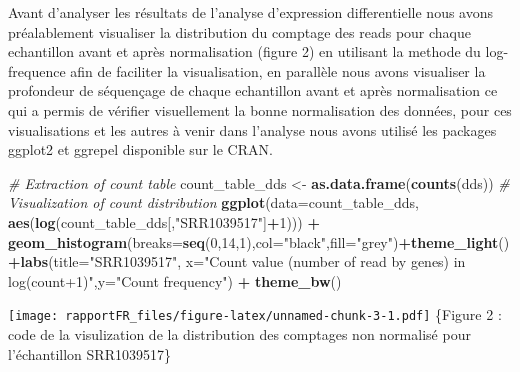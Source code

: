 \documentclass[
  12pt,
]{article}
\newenvironment{Shaded}{\begin{snugshade}}{\end{snugshade}}
\newcommand{\CommentTok}[1]{\textcolor[rgb]{0.56,0.35,0.01}{\textit{#1}}}
\newcommand{\DataTypeTok}[1]{\textcolor[rgb]{0.13,0.29,0.53}{#1}}
\newcommand{\DecValTok}[1]{\textcolor[rgb]{0.00,0.00,0.81}{#1}}
\newcommand{\KeywordTok}[1]{\textcolor[rgb]{0.13,0.29,0.53}{\textbf{#1}}}
\newcommand{\NormalTok}[1]{#1}
\newcommand{\OperatorTok}[1]{\textcolor[rgb]{0.81,0.36,0.00}{\textbf{#1}}}
\newcommand{\StringTok}[1]{\textcolor[rgb]{0.31,0.60,0.02}{#1}}
\begin{document}
Avant d'analyser les résultats de l'analyse d'expression differentielle
nous avons préalablement visualiser la distribution du comptage des
reads pour chaque echantillon avant et après normalisation (figure 2) en
utilisant la methode du log-frequence afin de faciliter la
visualisation, en parallèle nous avons visualiser la profondeur de
séquençage de chaque echantillon avant et après normalisation ce qui a
permis de vérifier visuellement la bonne normalisation des données, pour
ces visualisations et les autres à venir dans l'analyse nous avons
utilisé les packages ggplot2 et ggrepel disponible sur le CRAN.

\begin{Shaded}
\begin{Highlighting}[]
\CommentTok{# Extraction of count table}
\NormalTok{count_table_dds <-}\StringTok{ }\KeywordTok{as.data.frame}\NormalTok{(}\KeywordTok{counts}\NormalTok{(dds))}
\CommentTok{# Visualization of count distribution}
\KeywordTok{ggplot}\NormalTok{(}\DataTypeTok{data=}\NormalTok{count_table_dds, }\KeywordTok{aes}\NormalTok{(}\KeywordTok{log}\NormalTok{(count_table_dds[,}\StringTok{"SRR1039517"}\NormalTok{]}\OperatorTok{+}\DecValTok{1}\NormalTok{))) }\OperatorTok{+}\StringTok{ }\KeywordTok{geom_histogram}\NormalTok{(}\DataTypeTok{breaks=}\KeywordTok{seq}\NormalTok{(}\DecValTok{0}\NormalTok{,}\DecValTok{14}\NormalTok{,}\DecValTok{1}\NormalTok{),}\DataTypeTok{col=}\StringTok{"black"}\NormalTok{,}\DataTypeTok{fill=}\StringTok{"grey"}\NormalTok{)}\OperatorTok{+}\KeywordTok{theme_light}\NormalTok{()}\OperatorTok{+}\KeywordTok{labs}\NormalTok{(}\DataTypeTok{title=}\StringTok{"SRR1039517"}\NormalTok{, }\DataTypeTok{x=}\StringTok{"Count value (number of read by genes) in log(count+1)"}\NormalTok{,}\DataTypeTok{y=}\StringTok{"Count frequency"}\NormalTok{) }\OperatorTok{+}\StringTok{ }\KeywordTok{theme_bw}\NormalTok{()}
\end{Highlighting}
\end{Shaded}

\texttt{[image: rapportFR\_files/figure-latex/unnamed-chunk-3-1.pdf]}
\normalsize \sffamily\small\{Figure 2 : code de la visulization de la
distribution des comptages non normalisé pour l'échantillon SRR1039517\}
\normalsize

\par
\end{document}
